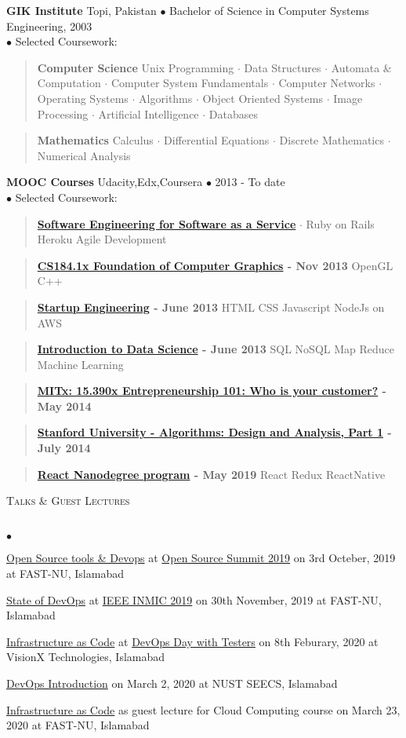 \documentclass{article}
\newcommand{\area}[2]{\vspace*{-9pt} \begin{verse}\textbf{#1}   #2 \end{verse}  }
\newcommand{\lineunder}{\vspace*{-8pt} \\ \hspace*{-18pt} \hrulefill \\}
\newcommand{\header}[1]{{\hspace*{-15pt}\vspace*{6pt} \textsc{#1}} \vspace*{-6pt} \lineunder}
\newenvironment{achievements}{\begin{list}{$\bullet$}{\topsep 0pt \itemsep -2pt}}{\vspace*{4pt}\end{list}}
\newcommand{\schoolwithcourses}[4]{
 \textbf{#1} #2 $\bullet$ #3\\ 
#4 $\bullet$  Selected Coursework:\\
\vspace*{5pt}
}
\begin{document}
\schoolwithcourses{GIK Institute}{Topi, Pakistan}{Bachelor of Science in Computer Systems Engineering, 2003}
{}
	\area{Computer Science}{ Unix Programming $\cdot$ Data Structures $\cdot$ Automata \& Computation $\cdot$ Computer System Fundamentals $\cdot$ Computer Networks $\cdot$ Operating Systems $\cdot$
 Algorithms $\cdot$ Object Oriented Systems $\cdot$ Image Processing $\cdot$
Artificial Intelligence $\cdot$ Databases}
	\area{Mathematics}{Calculus $\cdot$ Differential Equations $\cdot$ Discrete Mathematics $\cdot$ Numerical Analysis}
\schoolwithcourses{MOOC Courses}{Udacity,Edx,Coursera}{2013 - To date}
{}
	\area{\href{https://www.class-central.com/mooc/305/coursera-software-as-a-service}{Software Engineering for Software as a Service}}{ $\cdot$ Ruby on Rails Heroku Agile Development}
	\area{\href{https://www.edx.org/course/uc-berkeleyx/uc-berkeleyx-cs-184-1x-foundations-1003}{CS184.1x Foundation of Computer Graphics} - Nov 2013}{ OpenGL C++}
	\area{\href{https://www.coursera.org/course/startup}{Startup Engineering} - June 2013}{ HTML CSS Javascript NodeJs on AWS}
	\area{\href{https://www.coursera.org/course/datasci}{Introduction to Data Science} - June 2013}{SQL NoSQL Map Reduce Machine Learning}
	\area{\href{https://class.coursera.org/hetero-002}{MITx: 15.390x Entrepreneurship 101: Who is your customer?} - May 2014}{}
	\area{\href{https://www.class-central.com/course/coursera-algorithms-design-and-analysis-part-1-374}{Stanford University - Algorithms: Design and Analysis, Part 1} - July 2014}{}
	\area{\href{https://www.udacity.com/course/react-nanodegree--nd019}{React Nanodegree program} - May 2019}{ React Redux ReactNative}

\header{Talks \& Guest Lectures}
\begin{achievements}
\item
  \href{https://docs.google.com/presentation/d/1-moX3IvT8Ocrd4TDj8U76YCVTLhnvIooRV43PlslE6Q/edit?usp=sharing}{Open
  Source tools \& Devops} at
  \href{https://osfp.org.pk/page/homepage}{Open Source Summit 2019} on
  3rd Octeber, 2019 at FAST-NU, Islamabad
\item
  \href{https://docs.google.com/presentation/d/1PJMvFE-pQgFTW1SK5j9GxF9rVl3UIvvuFJaWmLvlE7Y/edit?usp=sharing}{State
  of DevOps} at
  \href{http://www.inmic.org.pk/Program/CompleteProgram.html}{IEEE INMIC
  2019} on 30th November, 2019 at FAST-NU, Islamabad
\item
  \href{https://docs.google.com/presentation/d/1uAh7D58lhLyDQfgcTfbdqgATQ0oq7zvZiaFbUGB1TLo/edit?usp=sharing}{Infrastructure
  as Code} at
  \href{https://www.facebook.com/events/166629501414148/}{DevOps Day
  with Testers} on 8th Feburary, 2020 at VisionX Technologies, Islamabad
\item
  \href{https://docs.google.com/presentation/d/1IoV68le3qeLUqXvrt8rwRueWpAWQ-Z_vxcbhycprFoY/edit?usp=sharing}{DevOps
  Introduction} on March 2, 2020 at NUST SEECS, Islamabad
\item
  \href{https://docs.google.com/presentation/d/10SGHkKEapM0bm9I-eQvae8vKA08LUj_QLH6LqvIu3bM/edit?usp=sharing}{Infrastructure
  as Code} as guest lecture for Cloud Computing course on March 23, 2020
  at FAST-NU, Islamabad
\end{achievements}
\end{document}

